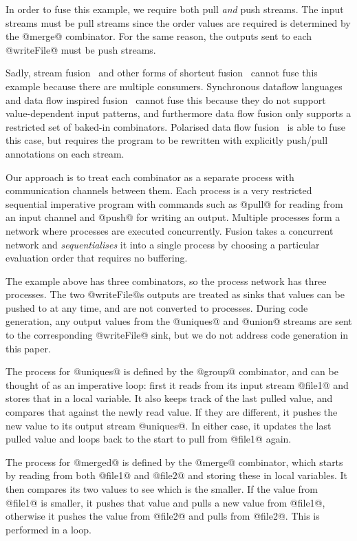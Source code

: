 In order to fuse this example, we require both pull \emph{and} push streams.
The input streams must be pull streams since the order values are required is determined by the @merge@ combinator.
For the same reason, the outputs sent to each @writeFile@ must be push streams.


Sadly, stream fusion~\cite{coutts2007stream} and other forms of shortcut fusion~\cite{jones2001playing} cannot fuse this example because there are multiple consumers.
Synchronous dataflow languages~\cite{mandel2010lucy} and data flow inspired fusion~\cite{lippmeier2013data} cannot fuse this because they do not support value-dependent input patterns, and furthermore data flow fusion only supports a restricted set of baked-in combinators.
Polarised data flow fusion~\cite{lippmeier2016polarized} is able to fuse this case, but requires the program to be rewritten with explicitly push/pull annotations on each stream.

Our approach is to treat each combinator as a separate process with communication channels between them.
Each process is a very restricted sequential imperative program with commands such as @pull@ for reading from an input channel and @push@ for writing an output.
Multiple processes form a network where processes are executed concurrently.
Fusion takes a concurrent network and \emph{sequentialises} it into a single process by choosing a particular evaluation order that requires no buffering.

The example above has three combinators, so the process network has three processes.
The two @writeFile@s outputs are treated as sinks that values can be pushed to at any time, and are not converted to processes.
During code generation, any output values from the @uniques@ and @union@ streams are sent to the corresponding @writeFile@ sink, but we do not address code generation in this paper.

The process for @uniques@ is defined by the @group@ combinator, and can be thought of as an imperative loop: first it reads from its input stream @file1@ and stores that in a local variable.
It also keeps track of the last pulled value, and compares that against the newly read value.
If they are different, it pushes the new value to its output stream @uniques@.
In either case, it updates the last pulled value and loops back to the start to pull from @file1@ again.

The process for @merged@ is defined by the @merge@ combinator, which starts by reading from both @file1@ and @file2@ and storing these in local variables.
It then compares its two values to see which is the smaller.
If the value from @file1@ is smaller, it pushes that value and pulls a new value from @file1@, otherwise it pushes the value from @file2@ and pulls from @file2@.
This is performed in a loop.

